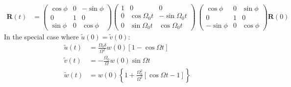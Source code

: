\begin{align*}
	\bm{R}(t) &= \begin{pmatrix}
			\cos\phi & 0 & -\sin\phi \\
			0 & 1 & 0 \\
			\sin\phi & 0 & \cos\phi
		     \end{pmatrix}
		     \begin{pmatrix}
		1 &0 &0 \\
		0 & \cos\Omega_0 t & -\sin\Omega_0 t \\
		0 & \sin\Omega_0t & \cos\Omega_0 t
		\end{pmatrix}\
		\begin{pmatrix}
			\cos\phi & 0 & \sin\phi \\
			0 & 1 & 0 \\
			-\sin\phi & 0 & \cos\phi
		\end{pmatrix} \bm{R}(0)
\end{align*}
In the special case where $\tilde{u}(0) = \tilde{v}(0)$:
\begin{align*}
	\tilde{u} (t) &= \frac{\Omega_0\delta}{\Omega^2}w(0)\left[1-\cos\Omega t\right] \\
	\tilde{v} (t) &= -\frac{\Omega_0}{\Omega}w(0)\sin\Omega t \\
	\tilde{w} (t) &= w(0)\left\{1 + \frac{\Omega_0^2}{\Omega^2} \left[\cos\Omega t -1\right]\right\}
\end{align*}
